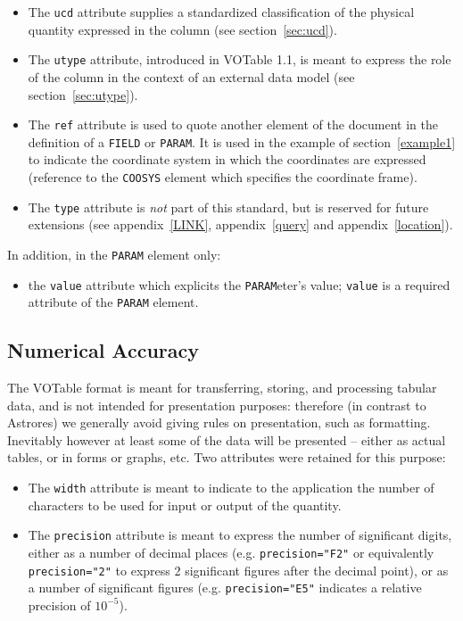 \documentclass[11pt,a4paper]{ivoa}
\def\Aref#1{section~\ref{#1}}
\def\Arefx#1{appendix~\ref{#1}}
\let\fg=\color
\def\attr#1{{\tt{\fg{DarkRed}#1}}}
\def\elem#1{{\tt{\fg{DarkRed}#1}}}
\def\attrval#1#2{{\tt{\fg{DarkRed}#1}="{\fg{DarkPurple}#2}"}}
\begin{document}
\begin{itemize}
\item   The \attr{ucd} attribute supplies a standardized classification
        of the physical quantity expressed in the column
        (see \Aref{sec:ucd}).

\item   The \attr{utype} attribute, introduced in VOTable 1.1, is meant
        to express the role of the column in the context of an external
        data model (see \Aref{sec:utype}).

\item   The \attr{ref} attribute is used to quote another element of
        the document in the definition of a \elem{FIELD} or \elem{PARAM}.
        It is used in the example of \Aref{example1}
        to indicate the coordinate system in which the coordinates
        are expressed
        (reference to the \elem{COOSYS} element which specifies the
        coordinate frame).

\item   The \attr{type} attribute is {\em not} part of this standard,
        but is reserved for future extensions (see
        \Arefx{LINK},
        \Arefx{query} and
        \Arefx{location}).

\end{itemize}

In addition, in the \elem{PARAM} element only:
\begin{itemize}
\item   the \attr{value} attribute which explicits the \elem{PARAM}eter's
        value; \attr{value} is a required attribute of the \elem{PARAM}
        element.
\end{itemize}

\subsection{Numerical Accuracy}
\label{sec:form}


The VOTable format is meant for transferring, storing, and
processing tabular data, and is not intended for presentation
purposes: therefore (in contrast to Astrores) we generally avoid
giving rules on presentation, such as formatting.
Inevitably however at least some of the data will be presented --
either as actual tables,  or in forms or graphs, etc.
Two attributes were retained for this purpose:

\begin{itemize}
\item   The {\attr{width}} attribute %
        is meant to indicate to the application
        the number of characters to be used for input
        or output of the quantity.

\item   The \attr{precision} attribute is meant to express the
        number of significant digits, either as a number of
        decimal places (e.g. \attrval{precision}{F2} or equivalently
        \attrval{precision}{2} to express 2 significant figures
        after the decimal point), or as a number of significant figures
        (e.g. \attrval{precision}{E5} indicates a relative precision
        of $10^{-5}$).
\end{itemize}
\end{document}
